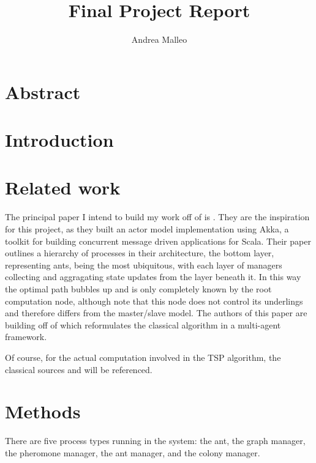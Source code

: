 \documentclass[11pt]{article}
\title{Final Project Report}
\author{Andrea Malleo}
\begin{document}
\maketitle
\section{Abstract}


\begin{multicols*}{2}
    \section{Introduction}


\section{Related work}
The principal paper I intend to build my work off of is \cite{star1}. They are the
inspiration for this project, as they built an actor model implementation
using Akka, a toolkit for building concurrent message driven applications 
for Scala. Their paper outlines a hierarchy of processes in their architecture,
the bottom layer, representing ants, being the most ubiquitous, with each 
layer of managers collecting and aggragating state updates from the layer
beneath it. In this way the optimal path bubbles up and is only completely 
known by the root computation node, although note that this node does 
not control its underlings and therefore differs from the master/slave model. 
The authors of this paper are building off of \cite{multiagent} which
reformulates the classical algorithm in a multi-agent framework.

Of course, for the actual computation involved in the TSP algorithm, the 
classical sources \cite{Dorigo1999AntCO} and \cite{Dorigo1997AntCS} will 
be referenced. 

\section{Methods}
There are five process types running in the system: the ant,
the graph manager, the pheromone manager, the ant manager, and the colony manager.


\end{multicols*}
\end{document}
